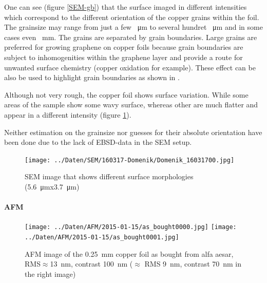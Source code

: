 One can see (figure \ref{SEM-gb}) that the surface imaged in different intensities which correspond to the different orientation of the copper grains within the foil\cite{wu_effects_2015}. The grainsize may range from just a few \SI{}{\micro \meter} to several hundret \SI{}{\micro \meter} and in some cases even \SI{}{\milli \meter}. The grains are separated by grain boundaries. Large grains are preferred for growing graphene on copper foils because grain boundaries are subject to inhomogenities within the graphene layer and provide a route for unwanted surface chemistry (copper oxidation for example). These effect can be also be used to highlight grain boundaries as shown in \cite{wu_effects_2015}.

Although not very rough, the copper foil shows surface variation. While some areas of the sample show some wavy surface, whereas other are much flatter and appear in a different intensity (figure \ref{SEM-surface}).

Neither estimation on the grainsize nor guesses for their absolute orientation have been done due to the lack of EBSD-data in the SEM setup.

\begin{figure}[h]
  \begin{center}
   \texttt{[image: ../Daten/SEM/160317-Domenik/Domenik\_16031700.jpg]}
  \end{center}
 \caption{SEM image that shows different surface morphologies (\SI{5.6}{\micro \meter}x\SI{3.7}{\micro \meter})}
 \label{SEM-surface}
\end{figure}

\paragraph{AFM}
\begin{figure}[h]
 \centering
 \texttt{[image: ../Daten/AFM/2015-01-15/as\_bought0000.jpg]}
 \texttt{[image: ../Daten/AFM/2015-01-15/as\_bought0001.jpg]}
 \caption{AFM image of the \SI{0.25}{\mm} copper foil as bought from alfa aesar, RMS$\approx$\SI{13}{\nm}, contrast \SI{100}{\nm} ($\approx$ RMS \SI{9}{\nm}, contrast \SI{70}{\nm} in the right image)}
 \label{fig:foil-afm-as-bought}
\end{figure}

